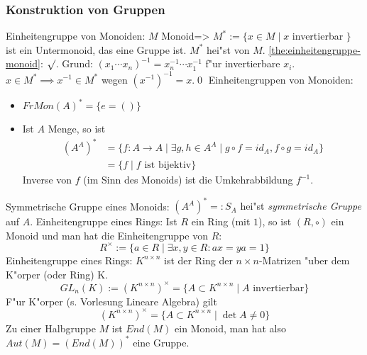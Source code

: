 \subsubsection*{Konstruktion von Gruppen}
\theorem Einheitengruppe von Monoiden:
  $M$ Monoid=>{
  \label{the:einheitengruppe-monoid}
  $M^* := \{ x\in M \mid x$ invertierbar $ \}$ ist ein Untermonoid, das eine 
  Gruppe ist. $M^*$ hei"st \emph{} von $M$.
  }
\proof \ref{the:einheitengruppe-monoid}:{
  $\surd$. Grund: $(x_1 \cdots x_n)^{-1} = x_n^{-1} \cdots x_1^{-1}$ f"ur
  invertierbare $x_i$. $x\in M^* \implies x^{-1} \in M^*$ wegen 
  $\left( x^{-1} \right) ^{-1}=x$.\qed
  }
\example Einheitengruppen von Monoiden:{
  \begin{itemize}
  \item $FrMon(A)^* = \{ e=() \}$
  \item Ist $A$ Menge, so ist
    \begin{align*}
      (A^A)^* 
      &= \{ f: A \to A \mid 
      \exists g,h \in A^A \mid g\circ f = id_A, f\circ g=id_A\}\\
      &=\{f \mid f\text{ ist bijektiv}\}
      \end{align*}
    Inverse von $f$ (im Sinn des Monoids) ist die Umkehrabbildung $f^{-1}$.
  \end{itemize}
  }
 Symmetrische Gruppe eines Monoids:{
  $(A^A)^* =: S_A$ hei"st \emph{symmetrische Gruppe} auf $A$.
  } 
 Einheitengruppe eines Rings:{
  Ist $R$ ein Ring (mit $1$), so ist $(R, \circ)$ ein Monoid 
  und man hat die Einheitengruppe von $R$:
  \[R^\times := \{ a \in R \mid \exists x,y \in R : ax = ya = 1 \}
    \]
  }
\example Einheitengruppe eines Rings:{
  $K^{n\times n}$ ist der Ring der $n\times n$-Matrizen 
  "uber dem K"orper (oder Ring) K.
  \[GL_n(K):=\left( K^{n\times n} \right)^\times = \{ A \subset K^{n\times n} \mid A \text{ invertierbar}\}
    \]
  F"ur K"orper (s. Vorlesung Lineare Algebra) gilt
  \[\left( K^{n\times n} \right)^\times = \{ A \subset K^{n\times n} \mid \det A\neq 0\}
    \]
  Zu einer Halbgruppe $M$ ist $End(M)$ ein Monoid, man hat also
  $Aut(M)=(End(M))^*$ eine Gruppe.
  }
